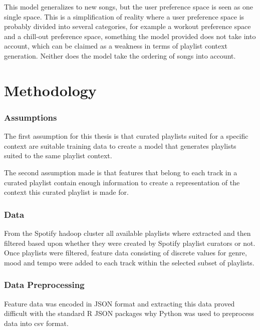 \documentclass[a4paper,11pt]{kth-mag}
\begin{document}
This model generalizes to new songs, but the user preference space is seen as one single space. This is a simplification of reality where a user preference space is probably divided into several categories, for example a workout preference space and a chill-out preference space, something the model provided does not take into account, which can be claimed as a weakness in terms of playlist context generation. Neither does the model take the ordering of songs into account.



\chapter{Methodology}

\subsection{Assumptions}
The first assumption for this thesis is that curated playlists suited for a specific context are suitable training data to create a model that generates playlists suited to the same playlist context.

The second assumption made is that features that belong to each track in a curated playlist contain enough information to create a representation of the context this curated playlist is made for.

\subsection{Data}
From the Spotify hadoop cluster all available playlists where extracted and then filtered based upon whether they were created by Spotify playlist curators or not. Once playlists were filtered, feature data consisting of discrete values for genre, mood and tempo were added to each track within the selected subset of playlists.

\subsection{Data Preprocessing}
Feature data was encoded in JSON format and extracting this data proved difficult with the standard R JSON packages why Python was used to preprocess data into csv format.
\end{document}
